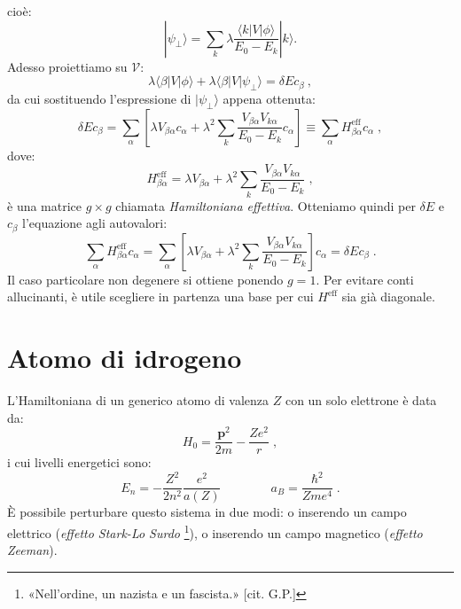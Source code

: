 \documentclass[12pt,a4paper]{report}
\theoremstyle{definition}
\numberwithin{equation}{section}
\newcommand{\bra}{\langle}
\newcommand{\ket}{\rangle}
\begin{document}
cioè:
\begin{equation}
|\psi_{\perp}\ket=\sum_k \lambda\frac{\bra k|V|\phi\ket}{E_0-E_k}|k\ket.
\end{equation}
Adesso proiettiamo su $\mathcal{V}$:
\begin{equation}
\lambda\bra\beta|V|\phi\ket+\lambda\bra\beta|V|\psi_{\perp}\ket=\delta E c_{\beta}\:,
\end{equation}
da cui sostituendo l'espressione di $|\psi_{\perp}\ket$ appena ottenuta:
\begin{equation}
\delta E c_{\beta}=\sum_{\alpha}\left[\lambda V_{\beta\alpha}c_{\alpha}+\lambda^2\sum_k\frac{V_{\beta\alpha}V_{k\alpha}}{E_0-E_k}c_{\alpha}\right]\equiv \sum_{\alpha} H^{\mathrm{eff}}_{\beta\alpha}c_{\alpha}\;,
\end{equation}
dove:
\begin{equation}
H^{\mathrm{eff}}_{\beta\alpha}=\lambda V_{\beta\alpha}+\lambda^2\sum_k\frac{V_{\beta\alpha}V_{k\alpha}}{E_0-E_k}\;,
\end{equation}
è una matrice $g\times g$ chiamata \textit{Hamiltoniana effettiva}. Otteniamo quindi per $\delta E$ e $c_{\beta}$ l'equazione agli autovalori:
\begin{equation}
\sum_{\alpha} H^{\mathrm{eff}}_{\beta\alpha}c_{\alpha}=\sum_{\alpha}\left[\lambda V_{\beta\alpha}+\lambda^2\sum_k \frac{V_{\beta\alpha}V_{k\alpha}}{E_0-E_k}\right]c_{\alpha}=\delta Ec_{\beta}\;.
\end{equation}
Il caso particolare non degenere si ottiene ponendo $g=1$. Per evitare conti allucinanti, è utile scegliere in partenza una base per cui $H^{\mathrm{eff}}$ sia già diagonale.
\section{Atomo di idrogeno}
L'Hamiltoniana di un generico atomo di valenza $Z$ con un solo elettrone è data da:
\begin{equation}
H_0=\frac{\mathbf{p}^2}{2m}-\frac{Ze^2}{r}\;,
\end{equation}
i cui livelli energetici sono:
\begin{equation}
E_n=-\frac{Z^2}{2n^2}\frac{e^2}{a(Z)} \qquad \qquad a_B=\frac{\hbar^2}{Zme^4}\;.
\end{equation}
È possibile perturbare questo sistema in due modi: o inserendo un campo elettrico (\textit{effetto Stark-Lo Surdo} \footnote{«Nell'ordine, un nazista e un fascista.» [cit. G.P.]}), o inserendo un campo magnetico (\textit{effetto Zeeman}).
\end{document}
